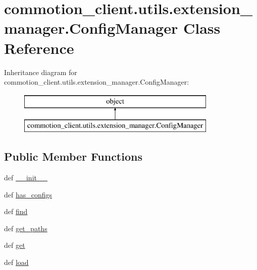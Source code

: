 \hypertarget{classcommotion__client_1_1utils_1_1extension__manager_1_1ConfigManager}{\section{commotion\+\_\+client.\+utils.\+extension\+\_\+manager.\+Config\+Manager Class Reference}
\label{classcommotion__client_1_1utils_1_1extension__manager_1_1ConfigManager}
}
Inheritance diagram for commotion\+\_\+client.\+utils.\+extension\+\_\+manager.\+Config\+Manager\+:\begin{figure}[H]
\begin{center}
\leavevmode
\includegraphics[height=2.000000cm]{classcommotion__client_1_1utils_1_1extension__manager_1_1ConfigManager}
\end{center}
\end{figure}
\subsection*{Public Member Functions}
\begin{DoxyCompactItemize}
\item 
def \hyperlink{classcommotion__client_1_1utils_1_1extension__manager_1_1ConfigManager_a152c0575bbf11ee6c2c1c24e300a7034}{\+\_\+\+\_\+init\+\_\+\+\_\+}
\item 
def \hyperlink{classcommotion__client_1_1utils_1_1extension__manager_1_1ConfigManager_ab8bb11d6b12687d9a7e22953d3125ef9}{has\+\_\+configs}
\item 
def \hyperlink{classcommotion__client_1_1utils_1_1extension__manager_1_1ConfigManager_a540ef57dff72ba46c043abd217e221cf}{find}
\item 
def \hyperlink{classcommotion__client_1_1utils_1_1extension__manager_1_1ConfigManager_ac8075c8f0e46b33f63c4b79f91d2ee3e}{get\+\_\+paths}
\item 
def \hyperlink{classcommotion__client_1_1utils_1_1extension__manager_1_1ConfigManager_aa5d4504ee2b1a228e0543e0bd4313b88}{get}
\item 
def \hyperlink{classcommotion__client_1_1utils_1_1extension__manager_1_1ConfigManager_a3da851319b205bf97e350946b4408ff8}{load}
\end{DoxyCompactItemize}
